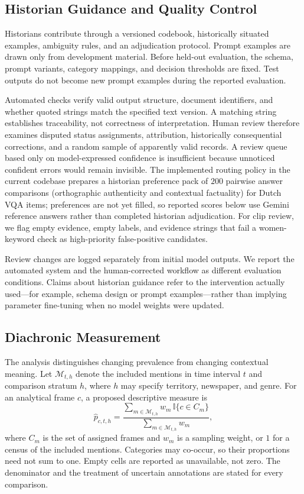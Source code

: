 \documentclass[sigconf]{acmart}
\newcommand{\ind}{\mathbb{I}}
\begin{document}
\subsection{Historian Guidance and Quality Control}

Historians contribute through a versioned codebook, historically situated examples, ambiguity rules, and an adjudication protocol. Prompt examples are drawn only from development material. Before held-out evaluation, the schema, prompt variants, category mappings, and decision thresholds are fixed. Test outputs do not become new prompt examples during the reported evaluation.

Automated checks verify valid output structure, document identifiers, and whether quoted strings match the specified text version. A matching string establishes traceability, not correctness of interpretation. Human review therefore examines disputed status assignments, attribution, historically consequential corrections, and a random sample of apparently valid records. A review queue based only on model-expressed confidence is insufficient because unnoticed confident errors would remain invisible. The implemented routing policy in the current codebase prepares a historian preference pack of $200$ pairwise answer comparisons (orthographic authenticity and contextual factuality) for Dutch VQA items; preferences are not yet filled, so reported scores below use Gemini reference answers rather than completed historian adjudication. For clip review, we flag empty evidence, empty labels, and evidence strings that fail a women-keyword check as high-priority false-positive candidates.

Review changes are logged separately from initial model outputs. We report the automated system and the human-corrected workflow as different evaluation conditions. Claims about historian guidance refer to the intervention actually used---for example, schema design or prompt examples---rather than implying parameter fine-tuning when no model weights were updated.

\subsection{Diachronic Measurement}

The analysis distinguishes changing prevalence from changing contextual meaning. Let $\mathcal{M}_{t,h}$ denote the included mentions in time interval $t$ and comparison stratum $h$, where $h$ may specify territory, newspaper, and genre. For an analytical frame $c$, a proposed descriptive measure is
\begin{equation}
\widehat{p}_{c,t,h}
=
\frac{\sum_{m\in\mathcal{M}_{t,h}} w_m\,\ind\{c\in C_m\}}
     {\sum_{m\in\mathcal{M}_{t,h}} w_m},
\label{eq:prevalence}
\end{equation}
where $C_m$ is the set of assigned frames and $w_m$ is a sampling weight, or $1$ for a census of the included mentions. Categories may co-occur, so their proportions need not sum to one. Empty cells are reported as unavailable, not zero. The denominator and the treatment of uncertain annotations are stated for every comparison.
\end{document}
